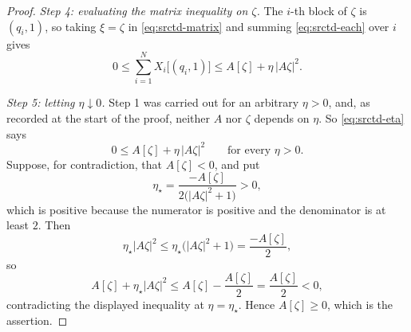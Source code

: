 \begin{proof}
\emph{Step 4: evaluating the matrix inequality on $\zeta$.}
The $i$-th block of $\zeta$ is $(q_i,1)$, so taking $\xi=\zeta$ in
\eqref{eq:srctd-matrix} and summing \eqref{eq:srctd-each} over $i$ gives
\begin{equation}\label{eq:srctd-eta}
  0\le\sum_{i=1}^NX_i\bigl[(q_i,1)\bigr]\le A[\zeta]+\eta\,|A\zeta|^2 .
\end{equation}

\emph{Step 5: letting $\eta\downarrow0$.}
Step 1 was carried out for an arbitrary $\eta>0$, and, as recorded at the start
of the proof, neither $A$ nor $\zeta$ depends on $\eta$. So \eqref{eq:srctd-eta}
says
\[
  0\le A[\zeta]+\eta\,|A\zeta|^2\qquad\text{for every }\eta>0 .
\]
Suppose, for contradiction, that $A[\zeta]<0$, and put
\[
  \eta_\star=\frac{-A[\zeta]}{2\bigl(|A\zeta|^2+1\bigr)}>0,
\]
which is positive because the numerator is positive and the denominator is at
least $2$. Then
\[
  \eta_\star|A\zeta|^2\le\eta_\star\bigl(|A\zeta|^2+1\bigr)=\frac{-A[\zeta]}2,
\]
so
\[
  A[\zeta]+\eta_\star|A\zeta|^2\le A[\zeta]-\frac{A[\zeta]}2
   =\frac{A[\zeta]}2<0,
\]
contradicting the displayed inequality at $\eta=\eta_\star$. Hence
$A[\zeta]\ge0$, which is the assertion.
\end{proof}
